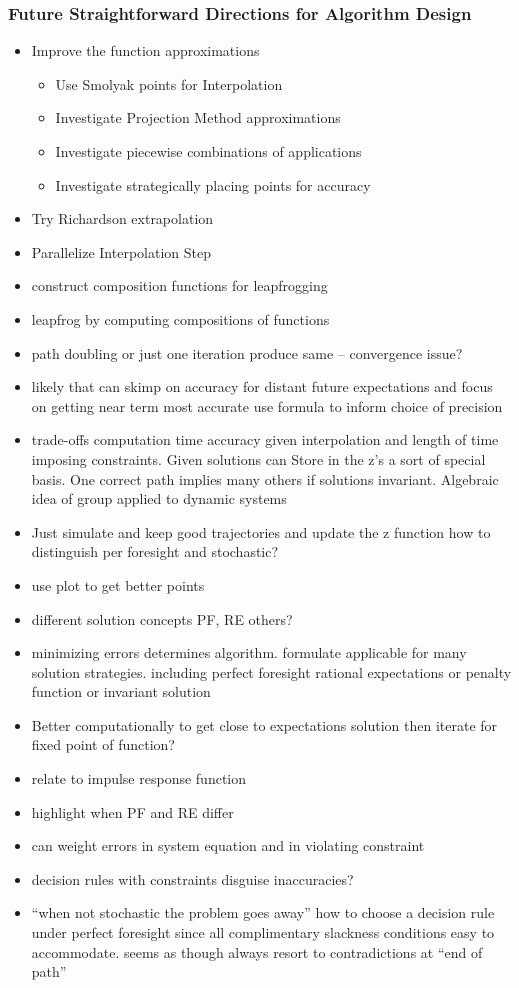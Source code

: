 \documentclass{beamer}
\begin{document}
  \begin{frame}
    \frametitle{Future Straightforward Directions for Algorithm Design}
    \begin{itemize}
\item Improve the function approximations
      \begin{itemize}
\item  Use Smolyak points for Interpolation
\item  Investigate Projection Method approximations
\item Investigate piecewise combinations of applications 
\item Investigate strategically placing points for accuracy
      \end{itemize}
     \item Try Richardson extrapolation
\item Parallelize Interpolation Step
\item construct composition functions for leapfrogging
\item leapfrog by computing compositions of functions
    \item path doubling or just one iteration produce same  -- convergence  issue?
\item likely that can skimp on accuracy for distant future expectations and focus on getting near term most accurate use formula to inform choice of precision
\item trade-offs computation time accuracy given interpolation and length of time imposing constraints.  Given solutions can Store in the z's a sort of special basis. One correct path implies many others if solutions invariant.   Algebraic idea of group applied to dynamic systems
\item Just simulate and keep good trajectories and update the z function how to distinguish per foresight and stochastic?
\item use plot to get better points
\item different solution concepts PF, RE others?
     \item minimizing errors determines algorithm. formulate applicable for many solution strategies.  including perfect foresight rational expectations or penalty function or invariant solution
\item Better computationally to get close to expectations solution then iterate for fixed point of function?
    \item relate to \citep{hintermaier10,Christiano2000} impulse response function
    \item highlight when PF and RE differ
\item can weight errors in system equation and in violating constraint
   	\item decision rules with constraints disguise inaccuracies?
    \item ``when not stochastic the problem goes away''  how to choose a decision rule under perfect foresight since all complimentary slackness conditions easy to accommodate. seems as though always resort to contradictions at ``end of path''
    \end{itemize}
  \end{frame}
\end{document}
